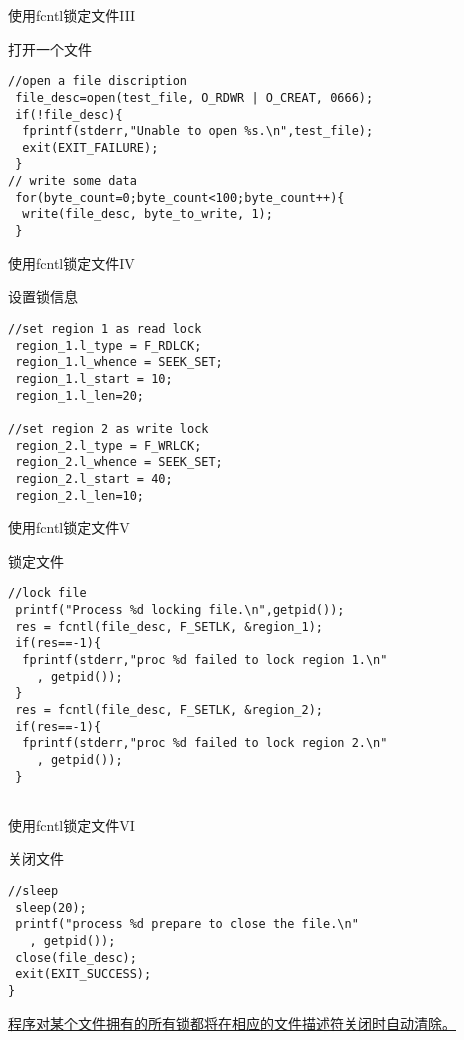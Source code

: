 \documentclass{beamer}
\begin{document}
\begin{frame}[fragile]{使用fcntl锁定文件III}
\begin{block}{打开一个文件}
\begin{lstlisting}
//open a file discription
 file_desc=open(test_file, O_RDWR | O_CREAT, 0666);
 if(!file_desc){
  fprintf(stderr,"Unable to open %s.\n",test_file);
  exit(EXIT_FAILURE);
 }
// write some data
 for(byte_count=0;byte_count<100;byte_count++){
  write(file_desc, byte_to_write, 1);
 }
\end{lstlisting}
\end{block}
\end{frame}
\begin{frame}[fragile]{使用fcntl锁定文件IV}
\begin{block}{设置锁信息}
\begin{lstlisting}
//set region 1 as read lock
 region_1.l_type = F_RDLCK;
 region_1.l_whence = SEEK_SET;
 region_1.l_start = 10;
 region_1.l_len=20;

//set region 2 as write lock	
 region_2.l_type = F_WRLCK;
 region_2.l_whence = SEEK_SET;
 region_2.l_start = 40;
 region_2.l_len=10;
\end{lstlisting}
\end{block}
\end{frame}
\begin{frame}[fragile]{使用fcntl锁定文件V}
\begin{block}{锁定文件}
\begin{lstlisting}
//lock file
 printf("Process %d locking file.\n",getpid());
 res = fcntl(file_desc, F_SETLK, &region_1);
 if(res==-1){
  fprintf(stderr,"proc %d failed to lock region 1.\n"
    , getpid());
 }
 res = fcntl(file_desc, F_SETLK, &region_2);
 if(res==-1){
  fprintf(stderr,"proc %d failed to lock region 2.\n"
    , getpid());
 }


\end{lstlisting}
\end{block}
\end{frame}
\begin{frame}[fragile]{使用fcntl锁定文件VI}
\begin{block}{关闭文件}
\begin{lstlisting}
//sleep
 sleep(20);
 printf("process %d prepare to close the file.\n"
   , getpid());
 close(file_desc);
 exit(EXIT_SUCCESS);
}
\end{lstlisting}
\end{block}
\underline{程序对某个文件拥有的所有锁都将在相应的文件描述符关闭时自动清除。}
\end{frame}
\end{document}
